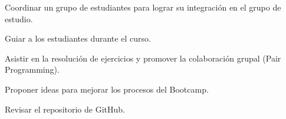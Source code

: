 \begin{cventries}
{\begin{cvitems}
        \item {Coordinar un grupo de estudiantes para lograr su integración en el grupo de estudio.}
        \item{Guiar a los estudiantes durante el curso.}
        \item{Asistir en la resolución de ejercicios y promover la colaboración grupal (Pair Programming).}
        \item{Proponer ideas para mejorar los procesos del Bootcamp.}
        \item{Revisar el repositorio de GitHub.}
      \end{cvitems}
    }

\end{cventries}

